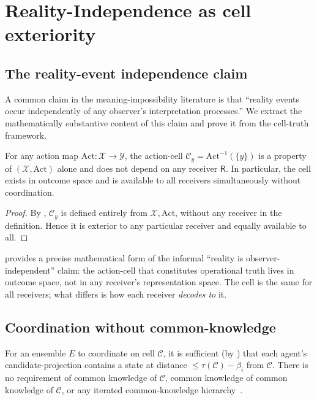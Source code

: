 \documentclass[11pt,a4paper]{article}
\newcommand{\X}{\mathcal{X}}
\newcommand{\Y}{\mathcal{Y}}
\newcommand{\Cell}{\mathcal{C}}
\newcommand{\receiver}{\mathsf{R}}
\newcommand{\Action}{\mathrm{Act}}
\begin{document}
\section{Reality-Independence as cell exteriority}
\label{sec:reality-indep}

\subsection{The reality-event independence claim}

A common claim in the meaning-impossibility literature is that
``reality events occur independently of any observer's interpretation
processes.'' We extract the mathematically substantive content of this
claim and prove it from the cell-truth framework.

\begin{theorem}\label{thm:exterior}
For any action map $\Action:\X\to\Y$, the action-cell
$\Cell_y=\Action^{-1}(\{y\})$ is a property of $(\X,\Action)$ alone
and does not depend on any receiver $\receiver$. In particular, the
cell exists in outcome space and is available to all receivers
simultaneously without coordination.
\end{theorem}

\begin{proof}
By , $\Cell_y$ is defined entirely from $\X,\Action$,
without any receiver in the definition. Hence it is exterior to any
particular receiver and equally available to all.
\end{proof}

\begin{remark}\label{rem:re-cell}
 provides a precise mathematical form of the
informal ``reality is observer-independent'' claim: the action-cell
that constitutes operational truth lives in outcome space, not in any
receiver's representation space. The cell is the same for all
receivers; what differs is how each receiver \emph{decodes to} it.
\end{remark}

\subsection{Coordination without common-knowledge}

\begin{theorem}
\label{thm:coord-no-ck}
For an ensemble $E$ to coordinate on cell $\Cell$, it is sufficient
(by ) that each agent's candidate-projection contains
a state at distance $\le\tau(\Cell)-\beta_i$ from $\Cell$. There is
no requirement of common knowledge of $\Cell$, common knowledge of
common knowledge of $\Cell$, or any iterated common-knowledge
hierarchy~\cite{aumann1976,fagin1995}.
\end{theorem}
\end{document}
